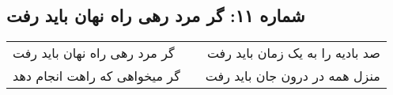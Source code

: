 \begin{center}
\section*{شماره ۱۱: گر مرد رهی راه نهان باید رفت}
\label{sec:011}
\begin{longtable}{l p{0.5cm} r}
گر مرد رهی راه نهان باید رفت
&&
صد بادیه را به یک زمان باید رفت
\\
گر میخواهی که راهت انجام دهد
&&
منزل همه در درون جان باید رفت
\\
\end{longtable}
\end{center}
